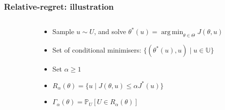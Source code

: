 \documentclass[11pt]{beamer}
\newcommand{\Prob}{\mathbb{P}}
\DeclareMathOperator*{\argmin}{arg\,min}
\newcommand{\kk}{\theta}
\newcommand{\uu}{u}
\newcommand{\UU}{U}
\newcommand{\Uspace}{\mathbb{U}}
\newcommand{\Kspace}{\Theta}
\begin{document}
\begin{frame}
  \frametitle{Relative-regret: illustration}

  \begin{columns}
    \begin{column}{0.45\textwidth}
      \vfill
      \only<1>{\resizebox{\linewidth}{!}{}}%
      \vfill
\end{column}
\begin{column}{.6\textwidth}
  \begin{itemize}
  \item<1-> Sample $\uu\sim\UU$, and solve
    $\kk^*(\uu) = \argmin_{\kk\in\Kspace} J(\kk,\uu)$
  \item<2->Set of conditional minimisers: $\{(\kk^*(\uu), \uu) \mid \uu \in \Uspace\}$
  \item<3-> Set $\alpha \geq 1$
  \item<4> $R_{\alpha}(\kk) = \{\uu \mid J(\kk,\uu) \leq \alpha J^*(\uu) \}$
  \item<4> $\Gamma_{\alpha}(\kk) = \Prob_{\UU}\left[\UU\in R_{\alpha}(\kk) \right]$
  \end{itemize}
\end{column}
\end{columns}
\end{frame}
\end{document}
